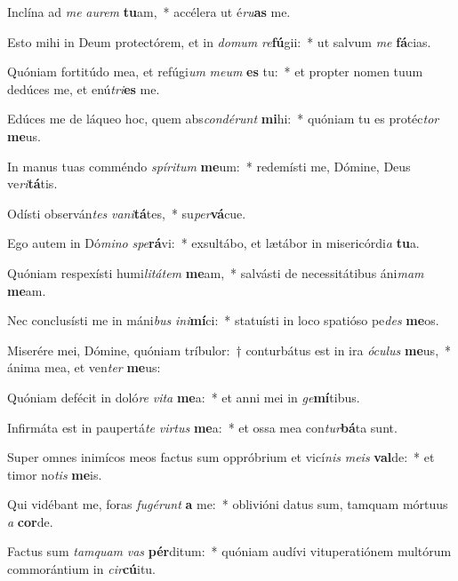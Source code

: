 \item Inclína ad \textit{me} \textit{au}\textit{rem} \textbf{tu}am,~* accélera ut é\textit{ru}\textbf{as} me.
\item Esto mihi in Deum protectórem, et in \textit{do}\textit{mum} \textit{re}\textbf{fú}gii:~* ut salvum \textit{me} \textbf{fá}cias.
\item Quóniam fortitúdo mea, et refúgi\textit{um} \textit{me}\textit{um} \textbf{es} tu:~* et propter nomen tuum dedúces me, et enú\textit{tri}\textbf{es} me.
\item Edúces me de láqueo hoc, quem abs\textit{con}\textit{dé}\textit{runt} \textbf{mi}hi:~* quóniam tu es protéc\textit{tor} \textbf{me}us.
\item In manus tuas comméndo \textit{spí}\textit{ri}\textit{tum} \textbf{me}um:~* redemísti me, Dómine, Deus ve\textit{ri}\textbf{tá}tis.
\item Odísti observán\textit{tes} \textit{va}\textit{ni}\textbf{tá}tes,~* su\textit{per}\textbf{vá}cue.
\item Ego autem in Dó\textit{mi}\textit{no} \textit{spe}\textbf{rá}vi:~* exsultábo, et lætábor in misericórdi\textit{a} \textbf{tu}a.
\item Quóniam respexísti humi\textit{li}\textit{tá}\textit{tem} \textbf{me}am,~* salvásti de necessitátibus áni\textit{mam} \textbf{me}am.
\item Nec conclusísti me in máni\textit{bus} \textit{in}\textit{i}\textbf{mí}ci:~* statuísti in loco spatióso pe\textit{des} \textbf{me}os.
\item Miserére mei, Dómine, quóniam tríbulor:~† conturbátus est in ira \textit{ó}\textit{cu}\textit{lus} \textbf{me}us,~* ánima mea, et ven\textit{ter} \textbf{me}us:
\item Quóniam defécit in doló\textit{re} \textit{vi}\textit{ta} \textbf{me}a:~* et anni mei in \textit{ge}\textbf{mí}tibus.
\item Infirmáta est in paupertá\textit{te} \textit{vir}\textit{tus} \textbf{me}a:~* et ossa mea con\textit{tur}\textbf{bá}ta sunt.
\item Super omnes inimícos meos factus sum oppróbrium et vicí\textit{nis} \textit{me}\textit{is} \textbf{val}de:~* et timor no\textit{tis} \textbf{me}is.
\item Qui vidébant me, foras \textit{fu}\textit{gé}\textit{runt} \textbf{a} me:~* oblivióni datus sum, tamquam mórtuus \textit{a} \textbf{cor}de.
\item Factus sum \textit{tam}\textit{quam} \textit{vas} \textbf{pér}ditum:~* quóniam audívi vituperatiónem multórum commorántium in \textit{cir}\textbf{cú}itu.
